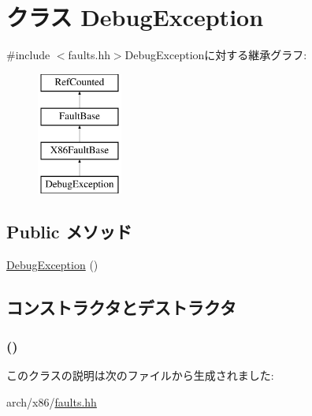 \hypertarget{classX86ISA_1_1DebugException}{
\section{クラス DebugException}
\label{classX86ISA_1_1DebugException}
}


{\ttfamily \#include $<$faults.hh$>$}DebugExceptionに対する継承グラフ:\begin{figure}[H]
\begin{center}
\leavevmode
\includegraphics[height=4cm]{classX86ISA_1_1DebugException}
\end{center}
\end{figure}
\subsection*{Public メソッド}
\begin{DoxyCompactItemize}
\item 
\hyperlink{classX86ISA_1_1DebugException_ae01398f1b85aec8dfec381bb355fa30a}{DebugException} ()
\end{DoxyCompactItemize}


\subsection{コンストラクタとデストラクタ}
\hypertarget{classX86ISA_1_1DebugException_ae01398f1b85aec8dfec381bb355fa30a}{
\subsubsection[{DebugException}]{ ()}}
\label{classX86ISA_1_1DebugException_ae01398f1b85aec8dfec381bb355fa30a}



\begin{DoxyCode}
207                          :
208             X86FaultBase("Debug", "#DB", 1)
209         {}
    };
\end{DoxyCode}


このクラスの説明は次のファイルから生成されました:\begin{DoxyCompactItemize}
\item 
arch/x86/\hyperlink{arch_2x86_2faults_8hh}{faults.hh}\end{DoxyCompactItemize}
